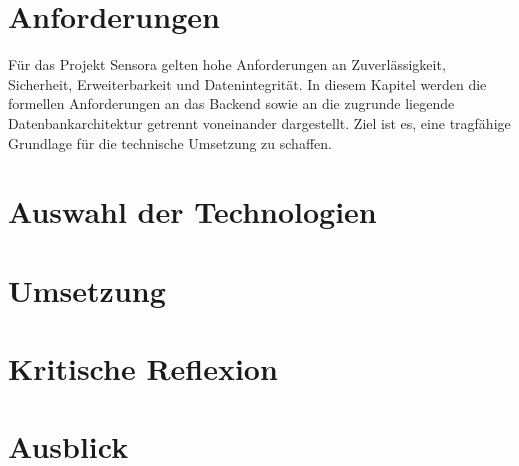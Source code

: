 \documentclass[a4paper,12pt]{report}
\begin{document}
	\newpage
	
	\chapter{Anforderungen}
    Für das Projekt Sensora gelten hohe Anforderungen an Zuverlässigkeit, Sicherheit, Erweiterbarkeit und Datenintegrität. In diesem Kapitel werden die formellen Anforderungen an das Backend sowie an die zugrunde liegende Datenbankarchitektur getrennt voneinander dargestellt. Ziel ist es, eine tragfähige Grundlage für die technische Umsetzung zu schaffen.
  
  
	
	
	\newpage
	
	\chapter{Auswahl der Technologien}
	
	
  
	
	
	
	
	
	
	\newpage
	
	\chapter{Umsetzung}
	
  
	
	
	
	
	
	\newpage

	
	
	\chapter{Kritische Reflexion}
	
	
	\newpage 
	
	\chapter{Ausblick}
	
	
\end{document}
